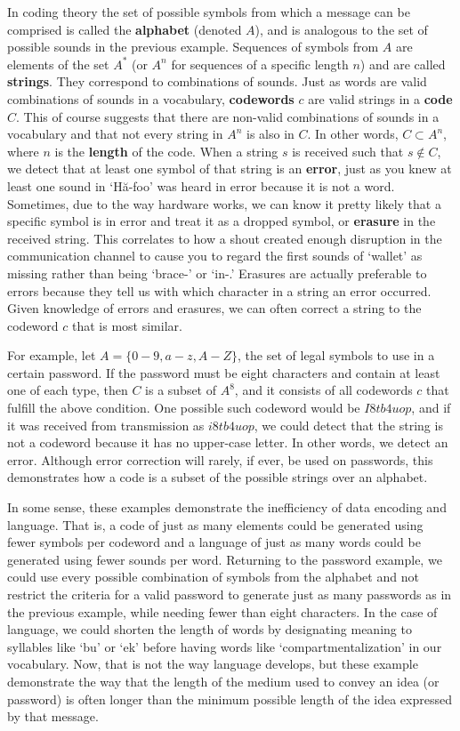 \documentclass[11pt]{article}
\begin{document}
In coding theory the set of possible symbols from which a message can be comprised is called the \textbf{alphabet} (denoted $A$), and is analogous to the set of possible sounds in the previous example. Sequences of symbols from $A$ are elements of the set $A^{*}$ (or $A^{n}$ for sequences of a specific length $n$) and are called \textbf{strings}. They correspond to combinations of sounds. Just as words are valid combinations of sounds in a vocabulary, \textbf{codewords} $c$ are valid strings in a \textbf{code} $C$. This of course suggests that there are non-valid combinations of sounds in a vocabulary and that not every string in $A^{n}$ is also in $C$. In other words, $C\subset A^{n}$, where $n$ is the \textbf{length} of the code. When a string $s$ is received such that $s\notin C$, we detect that at least one symbol of that string is an \textbf{error}, just as you knew at least one sound in `H\u{a}-foo' was heard in error because it is not a word. Sometimes, due to the way hardware works, we can know it pretty likely that a specific symbol is in error and treat it as a dropped symbol, or \textbf{erasure} in the received string. This correlates to how a shout created enough disruption in the communication channel to cause you to regard the first sounds of `wallet' as missing rather than being `brace-' or `in-.' Erasures are actually preferable to errors because they tell us with which character in a string an error occurred. Given knowledge of errors and erasures, we can often correct a string to the codeword $c$ that is most similar.

For example, let $A = \{0-9,a-z,A-Z\}$, the set of legal symbols to use in a certain password. If the password must be eight characters and contain at least one of each type, then $C$ is a subset of $A^{8}$, and it consists of all codewords $c$ that fulfill the above condition. One possible such codeword would be $I8tb4uop$, and if it was received from transmission as $i8tb4uop$, we could detect that the string is not a codeword because it has no upper-case letter. In other words, we detect an error. Although error correction will rarely, if ever, be used on passwords, this demonstrates how a code is a subset of the possible strings over an alphabet.

In some sense, these examples demonstrate the inefficiency of data encoding and language. That is, a code of just as many elements could be generated using fewer symbols per codeword and a language of just as many words could be generated using fewer sounds per word. Returning to the password example, we could use every possible combination of symbols from the alphabet and not restrict the criteria for a valid password to generate just as many passwords as in the previous example, while needing fewer than eight characters. In the case of language, we could shorten the length of words by designating meaning to syllables like `bu' or `ek' before having words like `compartmentalization' in our vocabulary. Now, that is not the way language develops, but these example demonstrate the way that the length of the medium used to convey an idea (or password) is often longer than the minimum possible length of the idea expressed by that message.
\end{document}
